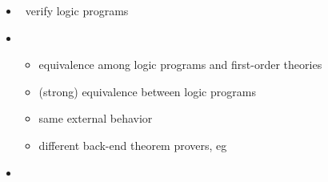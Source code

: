 \begin{frame}{\anthem}
  \begin{itemize}
  \item {} \ verify logic programs
  \item {}
    \begin{itemize}
      \item equivalence among logic programs and first-order theories
      \item (strong) equivalence between logic programs
      \item same external behavior
      \item different back-end theorem provers, eg \vampire
    \end{itemize}
  \item {} \ \cite{lilusc19a,falilusc20a}
  \end{itemize}
\end{frame}
%
